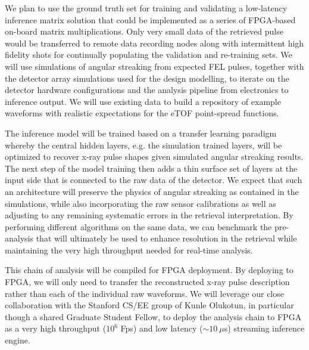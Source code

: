 We plan to use the ground truth set for training and validating a low-latency inference matrix solution that could be implemented as a series of FPGA-based on-board matrix multiplications.
Only very small data of the retrieved pulse would be transferred to remote data recording nodes along with intermittent high fidelity shots for continually populating the validation and re-training sets.
We will use simulations of angular streaking from expected FEL pulses, together with the detector array simulations used for the design modelling, to iterate on the detector hardware configurations and the analysis pipeline from electronics to inference output.
We will use existing data to build a repository of example waveforms with realistic expectations for the eTOF point-spread functions.  

The inference model will be trained based on a transfer learning paradigm whereby the central hidden layers, e.g. the simulation trained layers, will be optimized to recover x-ray pulse shapes given simulated angular streaking results.
The next step of the model training then adds a thin surface set of layers at the input side that is connected to the raw data of the detector.
We expect that such an architecture will preserve the physics of angular streaking as contained in the simulations, while also incorporating the raw sensor calibrations as well as adjusting to any remaining systematic errors in the retrieval interpretation.
By performing different algorithms on the same data, we can benchmark the pre-analysis that will ultimately be used to enhance resolution in the retrieval while maintaining the very high throughput needed for real-time analysis.

This chain of analysis will be compiled for FPGA deployment.  
By deploying to FPGA, we will only need to transfer the reconstructed x-ray pulse description rather than each of the individual raw waveforms. 
We will leverage our close collaboration with the Stanford CS/EE group of Kunle Olukotun, in particular though a shared Graduate Student Fellow, to deploy the analysis chain to FPGA as a very high throughput ($10^6$ Fps) and low latency ($\sim10~\mu$s) streaming inference engine.

